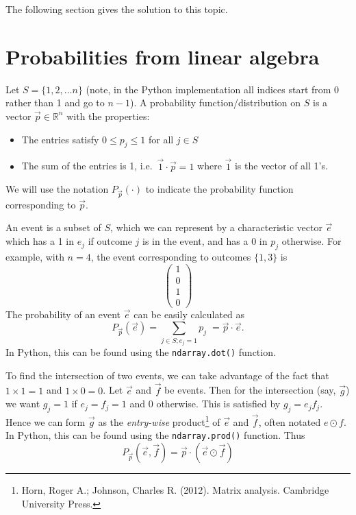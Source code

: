 \documentclass[a4paper]{exam}
\begin{document}
The following section gives the solution to this topic.


\section{Probabilities from linear algebra}
Let $S = \{ 1, 2, \dots  n \}$ (note, in the Python implementation all indices start from 0 rather than 1 and go to $n-1$).  A probability function/distribution on $S$ is a vector $\vec{p} \in \mathbb{R}^{n}$ with the properties:
\begin{itemize}
   \item The entries satisfy $ 0 \leq p_j \leq 1$  for all $j \in S$
   \item The sum of the entries is 1, i.e.\ $\vec{1} \cdot \vec{p} = 1$  where $\vec{1}$ is the vector of all 1's. 
\end{itemize}
We will use the notation $P_{\vec{p}}(\cdot)$ to indicate the probability function corresponding to $\vec{p}$.

An event is a subset of $S$, which we can represent by a characteristic vector $\vec{e}$ which has a 1 in $e_j$ if outcome $j$ is in the event, and has a 0 in $p_j$ otherwise.  For example, with $n = 4$, the event corresponding to outcomes $\{1,3\}$ is 
\[
   \left(
      \begin{array}{c}
         1 \\ 0 \\ 1 \\ 0
      \end{array}
   \right)
\]
The probability of an event $\vec{e}$ can be easily calculated as 
\[P_{\vec{p}}(\vec{e}) = \sum_{j \in S; e_j = 1} p_{j} \; = \vec{p} \cdot \vec{e}.\]
In Python, this can be found using the \lstinline!ndarray.dot()! function.

To find the intersection of two events, we can take advantage of the fact that $1 \times 1 = 1$ and $1 \times 0 = 0$.  Let $\vec{e}$ and $\vec{f}$ be events.  Then for the intersection (say, $\vec{g}$) we want $g_j = 1$ if $e_j = f_j = 1$ and 0 otherwise.  This is satisfied by $g_j = e_j f_j$.  Hence we can form $\vec{g}$ as the \emph{entry-wise} product\footnote{Horn, Roger A.; Johnson, Charles R. (2012). Matrix analysis. Cambridge University Press.} of $\vec{e}$ and $\vec{f}$, often notated $e \odot f$.  In Python, this can be found using the \lstinline!ndarray.prod()! function.  Thus
\[
   P_{\vec{p}}\left(\vec{e}, \vec{f}\right) = \vec{p} \cdot \left(\vec{e} \odot \vec{f}\right)
\]
\end{document}
